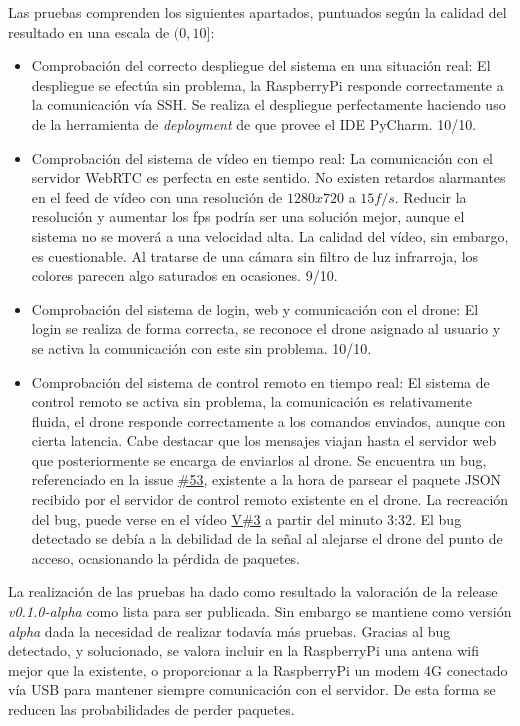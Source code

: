 Las pruebas comprenden los siguientes apartados, puntuados según la calidad del resultado en una escala de $(0, 10]$: 
\begin{itemize}
\item Comprobación del correcto despliegue del sistema en una situación real: El despliegue se efectúa sin problema, la RaspberryPi responde correctamente a la comunicación vía SSH. Se realiza el despliegue perfectamente haciendo uso de la herramienta de \emph{deployment} de que provee el IDE PyCharm. 10/10.
\item Comprobación del sistema de vídeo en tiempo real: La comunicación con el servidor WebRTC es perfecta en este sentido. No existen retardos alarmantes en el feed de vídeo con una resolución de $1280x720$ a $15f/s$. Reducir la resolución y aumentar los fps podría ser una solución mejor, aunque el sistema no se moverá a una velocidad alta. La calidad del vídeo, sin embargo, es cuestionable. Al tratarse de una cámara sin filtro de luz infrarroja, los colores parecen algo saturados en ocasiones.  9/10.
\item Comprobación del sistema de login, web y comunicación con el drone: El login se realiza de forma correcta, se reconoce el drone asignado al usuario y se activa la comunicación con este sin problema. 10/10.
\item Comprobación del sistema de control remoto en tiempo real: El sistema de control remoto se activa sin problema, la comunicación es relativamente fluida, el drone responde correctamente a los comandos enviados, aunque con cierta latencia. Cabe destacar que los mensajes viajan hasta el servidor web que posteriormente se encarga de enviarlos al drone. 
Se encuentra un bug, referenciado en la issue \href{https://github.com/mbm0089/GII_0_17.02_SNSI/issues/53}{\#53}, existente a la hora de parsear el paquete JSON recibido por el servidor de control remoto existente en el drone. La recreación del bug, puede verse en el vídeo \href{https://universidaddeburgos-my.sharepoint.com/:v:/g/personal/mbm0089_alu_ubu_es/ERit03PQ4GVJvVXNLCxQQwUBUjZt6VjCwl5GcLUYwFQGPQ?e=dD258g}{V\#3} a partir del minuto 3:32. 
El bug detectado se debía a la debilidad de la señal al alejarse el drone del punto de acceso, ocasionando la pérdida de paquetes.
\end{itemize}

La realización de las pruebas ha dado como resultado la valoración de la release \emph{v0.1.0-alpha} como lista para ser publicada. Sin embargo se mantiene como versión \emph{alpha} dada la necesidad de realizar todavía más pruebas. 
Gracias al bug detectado, y solucionado, se valora incluir en la RaspberryPi una antena wifi mejor que la existente, o proporcionar a la RaspberryPi un modem 4G conectado vía USB para mantener siempre comunicación con el servidor. De esta forma se reducen las probabilidades de perder paquetes. 


